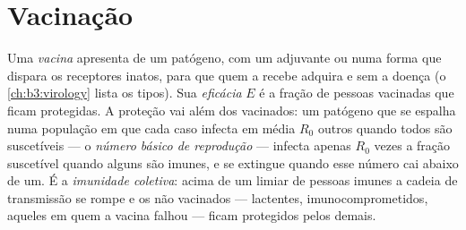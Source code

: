 \section{Vacinação}

\begin{definition}\label{def:b3:adaptive-immunity:vaccine}
Uma \emph{vacina} apresenta  de um patógeno, com um adjuvante
ou numa forma que dispara os receptores inatos, para que quem a recebe
adquira  e  sem a doença (o
\cref{ch:b3:virology} lista os tipos). Sua \emph{eficácia} $E$ é a
fração de pessoas vacinadas que ficam protegidas. A proteção vai além
dos vacinados: um patógeno que se espalha numa população em que cada
caso infecta em média $R_{0}$ outros quando todos são suscetíveis --- o
\emph{número básico de reprodução} --- infecta apenas $R_{0}$ vezes a
fração suscetível quando alguns são imunes, e se extingue quando esse
número cai abaixo de um. É a \emph{imunidade coletiva}: acima de um
limiar de pessoas imunes a cadeia de transmissão se rompe e os não
vacinados --- lactentes, imunocomprometidos, aqueles em quem a vacina
falhou --- ficam protegidos pelos demais.
\end{definition}

